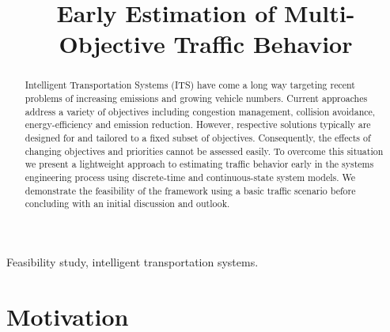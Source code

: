\documentclass[conference]{../cls/IEEEtran}
\begin{document}
\title{Early Estimation of Multi-Objective Traffic Behavior}

\author{
	\and
}

\maketitle

\begin{abstract}
Intelligent Transportation Systems (ITS) have come a long way targeting recent problems of increasing emissions and growing vehicle numbers. Current approaches address a variety of objectives including congestion management, collision avoidance, energy-efficiency and emission reduction. However, respective solutions typically are designed for and tailored to a fixed subset of objectives. Consequently, the effects of changing objectives and priorities cannot be assessed easily. To overcome this situation we present a lightweight approach to estimating traffic behavior early in the systems engineering process using discrete-time and continuous-state system models. We demonstrate the feasibility of the framework using a basic traffic scenario before concluding with an initial discussion and outlook.
\end{abstract}

\begin{IEEEkeywords}
Feasibility study, intelligent transportation systems.
\end{IEEEkeywords}

\section{Motivation}
\label{sec:motivation}
\end{document}
